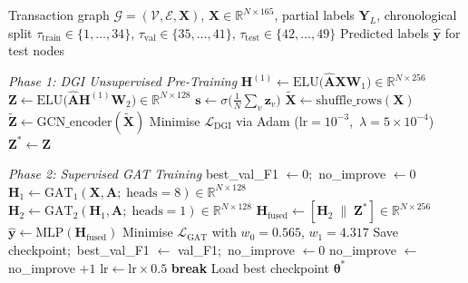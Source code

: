 \documentclass[12pt,a4paper]{article}
\begin{document}
\begin{algorithm}[htbp]
\caption{MixTrace Training and Inference}
\label{alg:mixtrace}
\begin{algorithmic}[1]
\Require Transaction graph
  $\mathcal{G}=(\mathcal{V},\mathcal{E},\mathbf{X})$,
  $\mathbf{X}\in\mathbb{R}^{N\times165}$,
  partial labels $\mathbf{Y}_L$, chronological split
  $\tau_\text{train}\!\in\!\{1,\ldots,34\}$,
  $\tau_\text{val}\!\in\!\{35,\ldots,41\}$,
  $\tau_\text{test}\!\in\!\{42,\ldots,49\}$
\Ensure Predicted labels $\hat{\mathbf{y}}$ for test nodes

\vspace{2pt}
\Statex \textit{Phase 1: DGI Unsupervised Pre-Training}
  \State $\mathbf{H}^{(1)} \leftarrow
    \text{ELU}\!\bigl(\hat{\mathbf{A}}\mathbf{X}\mathbf{W}_1\bigr)
    \in \mathbb{R}^{N\times256}$
  \State $\mathbf{Z} \leftarrow
    \text{ELU}\!\bigl(\hat{\mathbf{A}}\mathbf{H}^{(1)}\mathbf{W}_2\bigr)
    \in \mathbb{R}^{N\times128}$
  \State $\mathbf{s} \leftarrow
    \sigma\!\bigl(\tfrac{1}{N}\textstyle\sum_v\mathbf{z}_v\bigr)$
  \State $\tilde{\mathbf{X}} \leftarrow \text{shuffle\_rows}(\mathbf{X})$
  \State $\tilde{\mathbf{Z}} \leftarrow
    \text{GCN\_encoder}(\tilde{\mathbf{X}})$
  \State Minimise $\mathcal{L}_\text{DGI}$ via Adam
    ($\text{lr}=10^{-3}$,\ $\lambda=5\times10^{-4}$)
\EndFor
\State $\mathbf{Z}^* \leftarrow \mathbf{Z}$

\vspace{2pt}
\Statex \textit{Phase 2: Supervised GAT Training}
\State best\_val\_F1 $\leftarrow 0$;\ no\_improve $\leftarrow 0$
  \State $\mathbf{H}_1 \leftarrow
    \text{GAT}_1(\mathbf{X},\mathbf{A};\;\text{heads}=8)
    \in \mathbb{R}^{N\times128}$
  \State $\mathbf{H}_2 \leftarrow
    \text{GAT}_2(\mathbf{H}_1,\mathbf{A};\;\text{heads}=1)
    \in \mathbb{R}^{N\times128}$
  \State $\mathbf{H}_\text{fused} \leftarrow
    [\mathbf{H}_2 \;\|\; \mathbf{Z}^*]
    \in \mathbb{R}^{N\times256}$
  \State $\hat{\mathbf{y}} \leftarrow
    \text{MLP}(\mathbf{H}_\text{fused})$
  \State Minimise $\mathcal{L}_\text{GAT}$ with
    $w_0\!=\!0.565$, $w_1\!=\!4.317$
    \State Save checkpoint;\ best\_val\_F1 $\leftarrow$ val\_F1;\ no\_improve $\leftarrow 0$
  \Else
    \State no\_improve $\leftarrow$ no\_improve $+1$
      \State $\text{lr} \leftarrow \text{lr} \times 0.5$
    \EndIf
      \textbf{ break}
    \EndIf
  \EndIf
\EndFor
\State Load best checkpoint $\boldsymbol{\theta}^*$


\end{algorithmic}
\end{algorithm}
\end{document}
